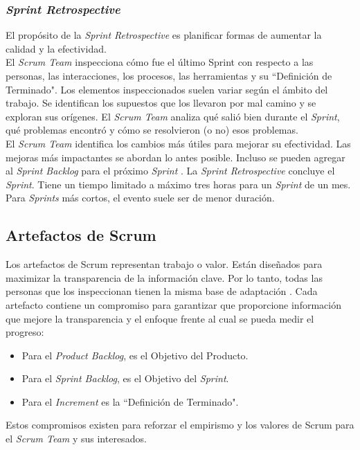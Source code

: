 \begin{spacing}{1.5}
		\subsubsection{\textit{Sprint Retrospective}}
			El propósito de la \textit{Sprint Retrospective} es planificar formas de aumentar la calidad y la efectividad.\\
			El \textit{Scrum Team} inspecciona cómo fue el último Sprint con respecto a las personas, las interacciones, los procesos, las herramientas y su ``Definición de Terminado". Los elementos inspeccionados suelen variar según el ámbito del trabajo. Se identifican los supuestos que los llevaron por mal camino y se exploran sus orígenes. El \textit{Scrum Team} analiza qué salió bien durante el \textit{Sprint}, qué problemas encontró y cómo se resolvieron (o no) esos problemas.\\
			El \textit{Scrum Team} identifica los cambios más útiles para mejorar su efectividad. Las mejoras más
			impactantes se abordan lo antes posible. Incluso se pueden agregar al \textit{Sprint Backlog} para el próximo \textit{Sprint} \cite{chap2_scrum}.
			La \textit{Sprint Retrospective} concluye el \textit{Sprint}. Tiene un tiempo limitado a máximo tres horas para un \textit{Sprint} de un mes. Para \textit{Sprints} más cortos, el evento suele ser de menor duración.
	\subsection{Artefactos de Scrum}
		Los artefactos de Scrum representan trabajo o valor. Están diseñados para maximizar la transparencia de la información clave. Por lo tanto, todas las personas que los inspeccionan tienen la misma base de adaptación \cite{chap2_scrum}.
		Cada artefacto contiene un compromiso para garantizar que proporcione información que mejore la transparencia y el enfoque frente al cual se pueda medir el progreso:
		\begin{itemize}
			\item Para el \textit{Product Backlog}, es el Objetivo del Producto.
			\item Para el \textit{Sprint Backlog}, es el Objetivo del \textit{Sprint}.
			\item Para el \textit{Increment} es la ``Definición de Terminado".
		\end{itemize}
		Estos compromisos existen para reforzar el empirismo y los valores de Scrum para el \textit{Scrum Team} y sus interesados.

\end{spacing}
